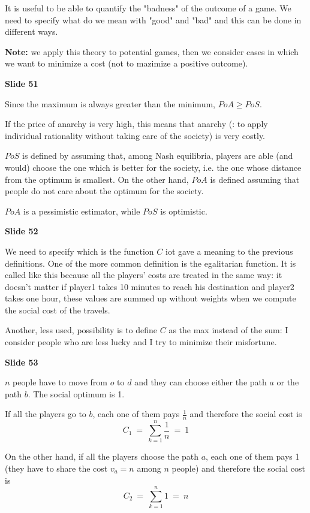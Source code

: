 \noindent It is useful to be able to quantify the "badness" of the outcome 
of a game. We need to specify what do we mean with "good" and "bad" and 
this can be done in different ways.

\noindent \textbf{Note:} we apply this theory to potential games, then we 
consider cases in which we want to minimize a cost (not to mazimize a 
positive outcome).

\bigskip
\noindent \textbf{Slide 51}

\noindent Since the maximum is always greater than the minimum, $PoA \geq PoS$.

\noindent If the price of anarchy is very high, this means that anarchy 
(: to apply individual rationality without taking care of the society) is 
very costly. 

\noindent $PoS$ is defined by assuming that, among Nash equilibria, players 
are able (and would) choose the one which is better for the society, i.e. 
the one whose distance from the optimum is smallest. On the other hand, $PoA$ 
is defined assuming that people do not care about the optimum for the society.

\noindent $PoA$ is a pessimistic estimator, while $PoS$ is optimistic.

\bigskip
\noindent \textbf{Slide 52}

\noindent We need to specify which is the function $C$ iot gave a meaning 
to the previous definitions. One of the more common definition is the 
egalitarian function. It is called like this because all the players' costs 
are treated in the same way: it doesn't matter if player1 takes 10 minutes 
to reach his destination and player2 takes one hour, these values are 
summed up without weights when we compute the social cost of the travels.

\noindent Another, less used, possibility is to define $C$ as the max 
instead of the sum: I consider people who are less lucky and I try to 
minimize their misfortune.

\bigskip
\noindent \textbf{Slide 53}

\noindent $n$ people have to move from $o$ to $d$ and they can choose either 
the path $a$ or the path $b$. The social optimum is 1. 

\noindent If all the players go to $b$, each one of them pays $\frac{1}{n}$ 
and therefore the social cost is
\[
	C_1~=~\sum_{k=1}^n{\frac{1}{n}}~=~1
\]

\noindent On the other hand, if all the players choose the path $a$, each one 
of them pays 1 (they have to share the cost $v_a=n$ among $n$ people) and 
therefore the social cost is 
\[
	C_2~=~\sum_{k=1}^n{1}~=~n
\]

